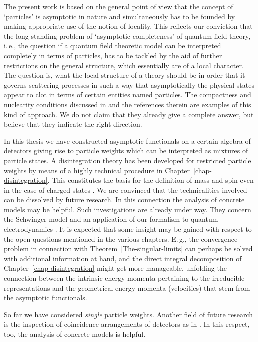 \documentclass[11pt,twoside,openright]{report}
\theoremstyle{definition}
\theoremstyle{plain}
\theoremstyle{remark}
\theoremstyle{assumption}
\begin{document}
The present work is based on the general point of view that the
concept of `particles' is asymptotic in nature and simultaneously has
to be founded by making appropriate use of the notion of locality.
This reflects our conviction that the long-standing problem of
`asymptotic completeness' of quantum field theory, i.\,e., the
question if a quantum field theoretic model can be interpreted
completely in terms of particles, has to be tackled by the aid of
further restrictions on the general structure, which essentially are
of a local character. The question is, what the local structure of a
theory should be in order that it governs scattering processes in such
a way that asymptotically the physical states appear to clot in terms
of certain entities named particles. The compactness and nuclearity
conditions discussed in \cite{buchholz/porrmann:1990} and the
references therein are examples of this kind of approach. We do not
claim that they already give a complete answer, but believe that they
indicate the right direction.

In this thesis we have constructed asymptotic functionals on a
certain algebra of detectors giving rise to particle weights which can
be interpreted as mixtures of particle states. A disintegration theory
has been developed for restricted particle weights by means of a
highly technical procedure in Chapter~\ref{chap-disintegration}. This
constitutes the basis for the definition of mass and spin even in the
case of charged states \cite{buchholz/porrmann}. We are convinced that
the technicalities involved can be dissolved by future research. In
this connection the analysis of concrete models may be helpful. Such
investigations are already under way. They concern the Schwinger model
\cite{gruening:1999} and an application of our formalism to quantum
electrodynamics \cite{fredenhagen/freund}. It is expected that some
insight may be gained with respect to the open questions mentioned in
the various chapters. E.\,g., the convergence problem in connection
with Theorem~\ref{The-singular-limits} can perhaps be solved with
additional information at hand, and the direct integral decomposition
of Chapter~\ref{chap-disintegration} might get more manageable,
unfolding the connection between the intrinsic energy-momenta
pertaining to the irreducible representations and the geometrical
energy-momenta (velocities) that stem from the asymptotic functionals.

So far we have considered \emph{single} particle weights. Another
field of future research is the inspection of coincidence arrangements
of detectors as in \cite{araki/haag:1967}. In this respect, too, the
analysis of concrete models is helpful.
\end{document}
